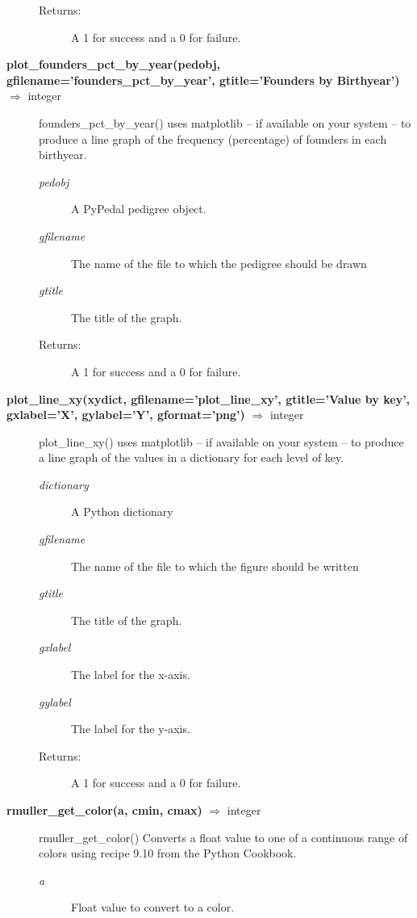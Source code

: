 \begin{description}
\begin{description}
\item[Returns:] A 1 for success and a 0 for failure.
\end{description}
\item[\textbf{plot\_founders\_pct\_by\_year(pedobj, gfilename='founders\_pct\_by\_year', gtitle='Founders by Birthyear')} $\Rightarrow$ integer]
founders\_pct\_by\_year() uses matplotlib -- if available on your system -- to produce a line graph of the frequency (percentage) of founders in each birthyear.
\begin{description}
\item[\emph{pedobj}] A PyPedal pedigree object.
\item[\emph{gfilename}] The name of the file to which the pedigree should be drawn
\item[\emph{gtitle}] The title of the graph.
\item[Returns:] A 1 for success and a 0 for failure.
\end{description}
\label{sec:pyp-graphics-plot-line-xy}
\item[\textbf{plot\_line\_xy(xydict, gfilename='plot\_line\_xy', gtitle='Value by key', gxlabel='X', gylabel='Y', gformat='png')} $\Rightarrow$ integer]
plot\_line\_xy() uses matplotlib -- if available on your system -- to produce a line graph of the values in a dictionary for each level of key.
\begin{description}
\item[\emph{dictionary}] A Python dictionary
\item[\emph{gfilename}] The name of the file to which the figure should be written
\item[\emph{gtitle}] The title of the graph.
\item[\emph{gxlabel}] The label for the x-axis.
\item[\emph{gylabel}] The label for the y-axis.
\item[Returns:] A 1 for success and a 0 for failure.
\end{description}
\item[\textbf{rmuller\_get\_color(a, cmin, cmax)} $\Rightarrow$ integer]
rmuller\_get\_color() Converts a float value to one of a continuous range of colors using recipe 9.10 from the Python Cookbook.
\begin{description}
\item[\emph{a}] Float value to convert to a color.

\end{description}
\end{description}

